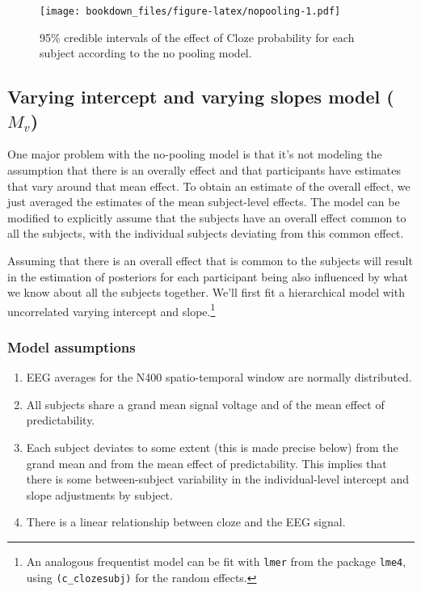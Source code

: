 \documentclass[12pt,]{krantz}
\providecommand{\tightlist}{%
  \setlength{\itemsep}{0pt}\setlength{\parskip}{0pt}}
\theoremstyle{definition}
\theoremstyle{definition}
\theoremstyle{definition}
\theoremstyle{remark}
\begin{document}
\begin{figure}
\centering
\texttt{[image: bookdown\_files/figure-latex/nopooling-1.pdf]}
\caption{\label{fig:nopooling}95\% credible intervals of the effect of Cloze probability for each subject according to the no pooling model.}
\end{figure}

\hypertarget{sec:uncorrelated}{%
\subsection{\texorpdfstring{Varying intercept and varying slopes model (\(M_{v}\))}{Varying intercept and varying slopes model (M\_\{v\})}}\label{sec:uncorrelated}}

One major problem with the no-pooling model is that it's not modeling the assumption that there is an overally effect and that participants have estimates that vary around that mean effect. To obtain an estimate of the overall effect, we just averaged the estimates of the mean subject-level effects. The model can be modified to explicitly assume that the subjects have an overall effect common to all the subjects, with the individual subjects deviating from this common effect.

Assuming that there is an overall effect that is common to the subjects will result in the estimation of posteriors for each participant being also influenced by what we know about all the subjects together. We'll first fit a hierarchical model with uncorrelated varying intercept and slope.\footnote{An analogous frequentist model can be fit with \texttt{lmer} from the package \texttt{lme4}, using \texttt{(c\_cloze\textbar{}\textbar{}subj)} for the random effects.}

\hypertarget{model-assumptions-2}{%
\subsubsection{Model assumptions}\label{model-assumptions-2}}

\begin{enumerate}
\def\labelenumi{\arabic{enumi}.}
\tightlist
\item
  EEG averages for the N400 spatio-temporal window are normally distributed.
\item
  All subjects share a grand mean signal voltage and of the mean effect of predictability.
\item
  Each subject deviates to some extent (this is made precise below) from the grand mean and from the mean effect of predictability. This implies that there is some between-subject variability in the individual-level intercept and slope adjustments by subject.
\item
  There is a linear relationship between cloze and the EEG signal.
\end{enumerate}
\end{document}
